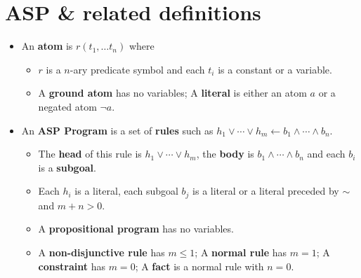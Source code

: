 \documentclass{beamer}
\newcommand{\naf}{\ensuremath{\sim\!}}
\newcommand{\deft}[1]{\textbf{#1}}
\begin{document}
\section*{ASP \& related definitions}
\begin{frame}
    
    \begin{itemize}
        \item An \deft{atom} is $r(t_1, \ldots t_n)$ where
        \begin{itemize}
            \item $r$ is a $n$-ary predicate symbol and each $t_i$ is a constant or a variable.
            \item A \deft{ground atom} has no variables; A \deft{literal} is either an atom $a$ or a negated atom $\neg a$.
        \end{itemize}
        
        \item An \deft{ASP Program} is a set of \deft{rules} such as $h_1 \vee \cdots \vee h_m \leftarrow b_1 \wedge \cdots \wedge b_n$.
        \begin{itemize}
            \item The \deft{head} of this rule is $h_1 \vee \cdots \vee h_m$, the \deft{body} is $b_1 \wedge \cdots \wedge b_n$ and each $b_i$ is a \deft{subgoal}.
            \item Each $h_i$ is a literal, each subgoal $b_j$ is a literal or a literal preceded by $\naf\;$ and $m + n > 0$.
            \item A \deft{propositional program} has no variables.
            \item A \deft{non-disjunctive rule} has $m \leq 1$; A \deft{normal rule} has $m = 1$; A \deft{constraint} has $m = 0$; A \deft{fact} is a normal rule with $n = 0$.
        \end{itemize}
        

\end{itemize}
\end{frame}
\end{document}
